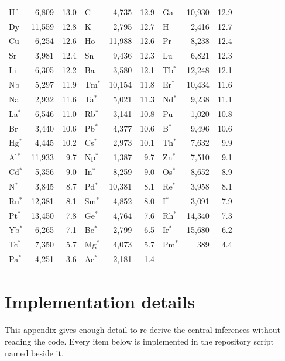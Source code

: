 \documentclass[11pt]{article}
\begin{document}
\begin{longtable}{lrr@{\hspace{1.6em}}lrr@{\hspace{1.6em}}lrr}
Hf & 6{,}809 & 13.0 & C & 4{,}735 & 12.9 & Ga & 10{,}930 & 12.9 \\
Dy & 11{,}559 & 12.8 & K & 2{,}795 & 12.7 & H & 2{,}416 & 12.7 \\
Cu & 6{,}254 & 12.6 & Ho & 11{,}988 & 12.6 & Pr & 8{,}238 & 12.4 \\
Sr & 3{,}981 & 12.4 & Sn & 9{,}436 & 12.3 & Lu & 6{,}821 & 12.3 \\
Li & 6{,}305 & 12.2 & Ba & 3{,}580 & 12.1 & Tb$^{*}$ & 12{,}248 & 12.1 \\
Nb & 5{,}297 & 11.9 & Tm$^{*}$ & 10{,}154 & 11.8 & Er$^{*}$ & 10{,}434 & 11.6 \\
Na & 2{,}932 & 11.6 & Ta$^{*}$ & 5{,}021 & 11.3 & Nd$^{*}$ & 9{,}238 & 11.1 \\
La$^{*}$ & 6{,}546 & 11.0 & Rb$^{*}$ & 3{,}141 & 10.8 & Pu & 1{,}020 & 10.8 \\
Br & 3{,}440 & 10.6 & Pb$^{*}$ & 4{,}377 & 10.6 & B$^{*}$ & 9{,}496 & 10.6 \\
Hg$^{*}$ & 4{,}445 & 10.2 & Cs$^{*}$ & 2{,}973 & 10.1 & Th$^{*}$ & 7{,}632 & 9.9 \\
Al$^{*}$ & 11{,}933 & 9.7 & Np$^{*}$ & 1{,}387 & 9.7 & Zn$^{*}$ & 7{,}510 & 9.1 \\
Cd$^{*}$ & 5{,}356 & 9.0 & In$^{*}$ & 8{,}259 & 9.0 & Os$^{*}$ & 8{,}652 & 8.9 \\
N$^{*}$ & 3{,}845 & 8.7 & Pd$^{*}$ & 10{,}381 & 8.1 & Re$^{*}$ & 3{,}958 & 8.1 \\
Ru$^{*}$ & 12{,}381 & 8.1 & Sm$^{*}$ & 4{,}852 & 8.0 & I$^{*}$ & 3{,}091 & 7.9 \\
Pt$^{*}$ & 13{,}450 & 7.8 & Ge$^{*}$ & 4{,}764 & 7.6 & Rh$^{*}$ & 14{,}340 & 7.3 \\
Yb$^{*}$ & 6{,}265 & 7.1 & Be$^{*}$ & 2{,}799 & 6.5 & Ir$^{*}$ & 15{,}680 & 6.2 \\
Tc$^{*}$ & 7{,}350 & 5.7 & Mg$^{*}$ & 4{,}073 & 5.7 & Pm$^{*}$ & 389 & 4.4 \\
Pa$^{*}$ & 4{,}251 & 3.6 & Ac$^{*}$ & 2{,}181 & 1.4 &  & &  \\
\bottomrule
\end{longtable}
\normalsize

\section{Implementation details}\label{app:impl}

This appendix gives enough detail to re-derive the central inferences without reading
the code. Every item below is implemented in the repository script named beside it.
\end{document}
